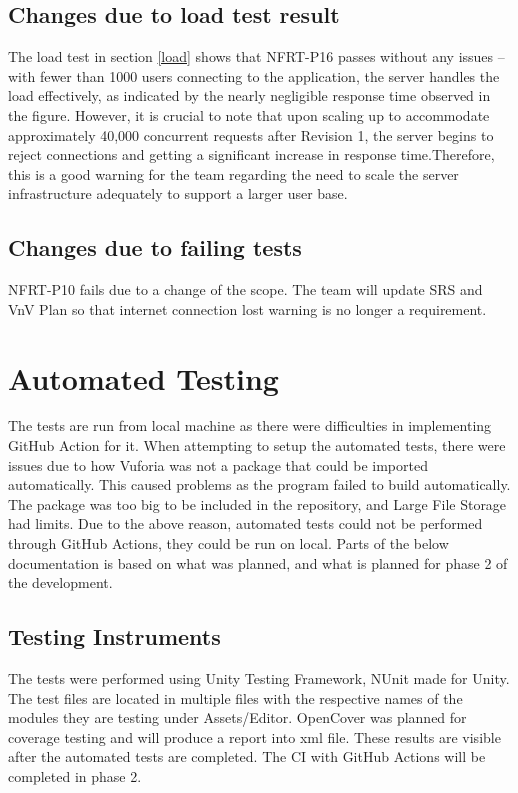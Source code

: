 \documentclass[12pt, titlepage]{article}
\begin{document}
\subsection{Changes due to load test result}
The load test in section \ref{load} shows that NFRT-P16 passes without any issues -- with fewer than 1000 users connecting to the application, the server handles the load effectively, as indicated by the nearly negligible response time observed in the figure. However, it is crucial to note that upon scaling up to accommodate approximately 40,000 concurrent requests after Revision 1, the server begins to reject connections and getting a significant increase in response time.Therefore, this is a good warning for the team regarding the need to scale the server infrastructure adequately to support a larger user base.
\subsection{Changes due to failing tests}
NFRT-P10 fails due to a change of the scope. The team will update SRS and VnV Plan so that internet connection lost warning is no longer a requirement.\\

\section{Automated Testing}
The tests are run from local machine as there were difficulties in implementing GitHub Action for it.
When attempting to setup the automated tests, there were issues due to how Vuforia was not a package that could be imported automatically.
This caused problems as the program failed to build automatically. The package was too big to be included in the repository, and Large File Storage had limits.
Due to the above reason, automated tests could not be performed through GitHub Actions, they could be run on local.
Parts of the below documentation is based on what was planned, and what is planned for phase 2 of the development.

\subsection{Testing Instruments}

The tests were performed using Unity Testing Framework, NUnit made for Unity.
The test files are located in multiple files with the respective names of the modules they are testing under Assets/Editor.
OpenCover was planned for coverage testing and will produce a report into xml file.
These results are visible after the automated tests are completed.
The CI with GitHub Actions will be completed in phase 2.
\end{document}
